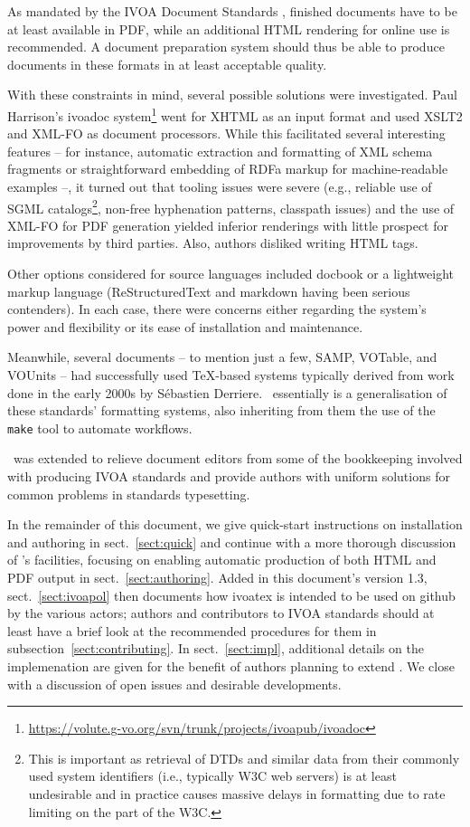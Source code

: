 \documentclass[11pt,a4paper]{ivoa}
\begin{document}
As mandated by the IVOA Document Standards \citep{2017ivoa.spec.0517G},
finished documents have to be at
least available in PDF, while an additional HTML rendering for online
use is recommended.  A document preparation system should thus be
able  to produce documents in these formats in at least acceptable
quality.

With these constraints in mind, several possible solutions were
investigated.  Paul
Harrison's ivoadoc
system\footnote{\url{https://volute.g-vo.org/svn/trunk/projects/ivoapub/ivoadoc}} 
went for XHTML as
an input format and used XSLT2 and XML-FO as document processors.  While
this facilitated several interesting features  -- for instance,
automatic extraction and formatting of XML schema fragments or
straightforward embedding of RDFa markup for machine-readable examples
--, it turned out that tooling issues were severe (e.g., reliable use
of SGML catalogs\footnote{This is important as retrieval of DTDs and
similar data from their commonly used system identifiers (i.e.,
typically W3C web servers) is at least undesirable and in practice
causes massive delays in formatting due to rate limiting on the part of
the W3C.}, non-free hyphenation patterns, classpath issues) and the use
of XML-FO for PDF generation yielded inferior renderings with little
prospect for improvements by third parties. Also, authors disliked
writing HTML tags.

Other options considered for source languages included docbook or 
a lightweight markup language (ReStructuredText and markdown having
been serious contenders).  
In each case, there were concerns either regarding the system's power
and flexibility or its ease of installation and maintenance.

Meanwhile, several documents -- to mention just a few, SAMP, VOTable,
and VOUnits -- had successfully used \TeX-based systems typically
derived from work done in the early 2000s by S\'ebastien Derriere.
\ivoatex\ essentially is a generalisation of these standards' formatting
systems, also inheriting from them the use of the \texttt{make} tool to
automate workflows.

\ivoatex\ was extended to relieve document editors from some of the
bookkeeping involved with producing IVOA standards and provide authors
with uniform solutions for common problems in standards typesetting.

In the remainder of this document, we give quick-start instructions
on installation and authoring in sect.~\ref{sect:quick} and continue
with
a more thorough discussion of \ivoatex's facilities, focusing
on enabling automatic production of both HTML and PDF output in
sect.~\ref{sect:authoring}.  Added in this document's version 1.3,
sect.~\ref{sect:ivoapol} then documents how ivoatex is intended to be
used on github by the various actors; authors and contributors to IVOA
standards should at least have a brief look at the recommended
procedures for them in subsection~\ref{sect:contributing}.
In sect.~\ref{sect:impl}, additional
details on the implemenation are given for the benefit of authors
planning to extend \ivoatex.  We close with a discussion of open issues
and desirable developments.
\end{document}
